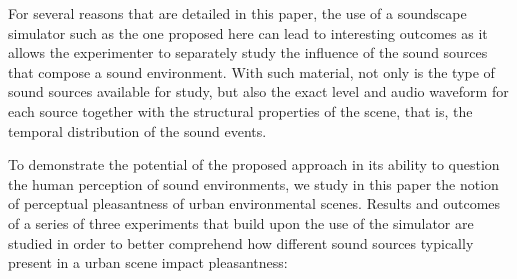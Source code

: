 \documentclass[12pt]{elsarticle}
\newcommand{\ie}{\emph{i.\,e.}}
\begin{document}

For several reasons that are detailed in this paper, the use of a soundscape simulator such as the one proposed here can lead to interesting outcomes as it allows the experimenter to separately study  the influence of the sound sources that compose a sound environment. With such material, not only is the type of sound sources available for study, but also the exact level and audio waveform for each source together with the structural properties of the scene, that is, the temporal distribution of the sound events.


To demonstrate the potential of the proposed approach in its ability to question the human perception of sound environments, we study in this paper the notion of perceptual pleasantness of urban environmental scenes. Results and outcomes of a series of three experiments that build upon the use of the simulator are studied in order to better comprehend how different sound sources typically present in a urban scene impact pleasantness:

\end{document}
